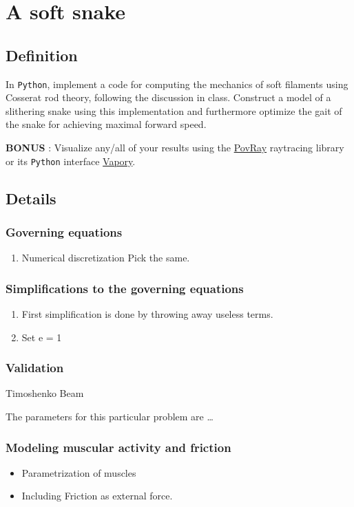\documentclass[11pt]{article}
\begin{document}
\section{A soft snake}
\label{sec:orgd1f5741}
\subsection{Definition}
\label{sec:orgc48a591}
In \texttt{Python}, implement a code for computing the mechanics of soft filaments
using Cosserat rod theory, following the discussion in class. Construct a
model of a slithering snake using this implementation and furthermore
optimize the gait of the snake for achieving maximal forward speed.

\textbf{BONUS} : Visualize any/all of your results using the \href{http://www.povray.org/}{PovRay} raytracing
library or its \texttt{Python} interface \href{https://github.com/Zulko/vapory}{Vapory}.
\subsection{Details}
\label{sec:org39b5084}
\subsubsection{Governing equations}
\label{sec:org4329c6e}
\begin{enumerate}
\item Numerical discretization
\label{sec:org0f324f0}
Pick the same.
\end{enumerate}
\subsubsection{Simplifications to the governing equations}
\label{sec:org733c01f}
\begin{enumerate}
\item First simplification is done by throwing away useless terms.
\label{sec:org9599b3f}
\item Set e = 1
\label{sec:org41cf07c}
\end{enumerate}
\subsubsection{Validation}
\label{sec:orgc3f792b}
Timoshenko Beam

The parameters for this particular problem are \ldots{}
\subsubsection{Modeling muscular activity and friction}
\label{sec:org229cf45}
\begin{itemize}
\item Parametrization of muscles
\item Including Friction as external force.
\end{itemize}
\end{document}
